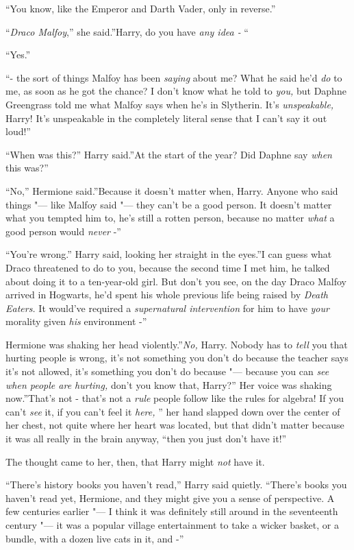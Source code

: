 ``You know, like the Emperor and Darth Vader, only in reverse.''

``\emph{Draco Malfoy},'' she said.''Harry, do you have \emph{any idea -}
``

``Yes.''

``- the sort of things Malfoy has been \emph{saying} about me? What he
said he'd \emph{do} to me, as soon as he got the chance? I don't know
what he told to \emph{you,} but Daphne Greengrass told me what Malfoy
says when he's in Slytherin. It's \emph{unspeakable,} Harry! It's
unspeakable in the completely literal sense that I can't say it out
loud!''

``When was this?'' Harry said.''At the start of the year? Did Daphne say
\emph{when} this was?''

``No,'' Hermione said.''Because it doesn't matter when, Harry. Anyone
who said things "--- like Malfoy said "--- they can't be a good person. It
doesn't matter what you tempted him to, he's still a rotten person,
because no matter \emph{what} a good person would \emph{never} -''

``You're wrong.'' Harry said, looking her straight in the eyes.''I can
guess what Draco threatened to do to you, because the second time I met
him, he talked about doing it to a ten-year-old girl. But don't you see,
on the day Draco Malfoy arrived in Hogwarts, he'd spent his whole
previous life being raised by \emph{Death Eaters.} It would've required
a \emph{supernatural intervention} for him to have \emph{your} morality
given \emph{his} environment -''

Hermione was shaking her head violently.''\emph{No,} Harry. Nobody has
to \emph{tell} you that hurting people is wrong, it's not something you
don't do because the teacher says it's not allowed, it's something you
don't do because "--- because you can \emph{see when people are hurting,}
don't you know that, Harry?'' Her voice was shaking now.''That's not -
that's not a \emph{rule} people follow like the rules for algebra! If
you can't \emph{see} it, if you can't feel it \emph{here,} '' her hand
slapped down over the center of her chest, not quite where her heart was
located, but that didn't matter because it was all really in the brain
anyway, ``then you just don't have it!''

The thought came to her, then, that Harry might \emph{not} have it.

``There's history books you haven't read,'' Harry said quietly.
``There's books you haven't read yet, Hermione, and they might give you
a sense of perspective. A few centuries earlier "--- I think it was
definitely still around in the seventeenth century "--- it was a popular
village entertainment to take a wicker basket, or a bundle, with a dozen
live cats in it, and -''

